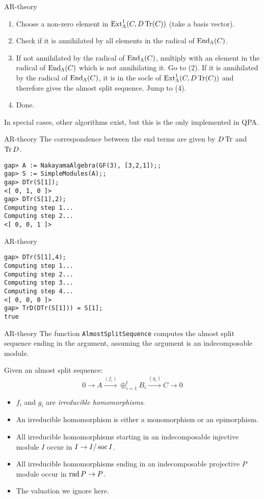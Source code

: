 \begin{frame}[fragile]{AR-theory}
\begin{enumerate}[\rm(1)]
\item Choose a non-zero element in $\operatorname{Ext}\nolimits^1_\Lambda(C,D\operatorname{Tr}\nolimits(C))$ (take a
  basis vector).
\item Check if it is annihilated by all elements in the radical of
  $\operatorname{End}\nolimits_\Lambda(C)$. 
\item If not annihilated by the radical of $\operatorname{End}\nolimits_\Lambda(C)$, multiply
  with an element in the radical of $\operatorname{End}\nolimits_\Lambda(C)$ which is not
  annihilating it.  Go to (2).  If it is annihilated by the radical of
  $\operatorname{End}\nolimits_\Lambda(C)$, it is in the socle of $\operatorname{Ext}\nolimits^1_\Lambda(C,D\operatorname{Tr}\nolimits(C))$
  and therefore gives the almost split sequence.  Jump to (4).
\item Done.
\end{enumerate}
In special cases, other algorithms exist, but this is the only
implemented in QPA. 
\end{frame}

\begin{frame}[fragile]{AR-theory}
The correspondence between the end terms are given by $D\operatorname{Tr}\nolimits$ and $\operatorname{Tr}\nolimits
D$. 
\begin{verbatim}
gap> A := NakayamaAlgebra(GF(3), [3,2,1]);;      
gap> S := SimpleModules(A);;
gap> DTr(S[1]);
<[ 0, 1, 0 ]>
gap> DTr(S[1],2);
Computing step 1...
Computing step 2...
<[ 0, 0, 1 ]>
\end{verbatim}
\end{frame}

\begin{frame}[fragile]{AR-theory}
\begin{verbatim}
gap> DTr(S[1],4);
Computing step 1...
Computing step 2...
Computing step 3...
Computing step 4...
<[ 0, 0, 0 ]>
gap> TrD(DTr(S[1])) = S[1];     
true
\end{verbatim}
\end{frame}

\begin{frame}[fragile]{AR-theory}
The function \texttt{AlmostSplitSequence} computes the almost split
sequence ending in the argument, assuming the argument is an
indecomposable module.\medskip

Given an almost split sequence: 
\[0\to A\xrightarrow{(f_i)} \oplus_{i=1}^t B_i\xrightarrow{(g_i)} C\to
0\]
\begin{itemize}
\item $f_i$ and $g_i$ are \emph{irreducible homomorphisms}. 
\item An irreducible homomorphism is either a monomorphism or an
  epimorphism.
\item All irreducible homomorphisms starting in an indecomposable
  injective module $I$ occur in $I\to I/\operatorname{soc}\nolimits I$.
\item All irreducible homomorphisms ending in an indecomposable
  projective $P$ module  occur in $\operatorname{rad}\nolimits P\to P$.
\item The valuation we ignore here. 
\end{itemize}
\end{frame}

